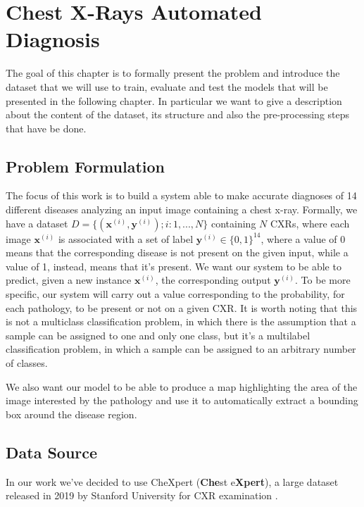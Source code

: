 \chapter{Chest X-Rays Automated Diagnosis}
\label{cha:third_chapter}

The goal of this chapter is to formally present the problem and introduce the dataset that we will use to train, evaluate and test the models that will be presented in the following chapter. In particular we want to give a description about the content of the dataset, its structure and also the pre-processing steps that have be done. 

\section{Problem Formulation}
\label{sec:problem_formulation}
The focus of this work is to build a system able to make accurate diagnoses of 14 different diseases analyzing an input image containing a chest x-ray. Formally, we have a dataset $D = \{(\mathbf{x}^{(\mathit{i})},\mathbf{y}^{(\mathit{i})}) ;\mathit{i}:1,...,N \}$ containing $N$ \acp{CXR}, where each image $\mathbf{x}^{(\mathit{i})}$ is associated with a set of label $\mathbf{y}^{(\mathit{i})} \in \{0,1\}^{14}$, where a value of 0 means that the corresponding disease is not present on the given input, while a value of 1, instead, means that it's present. We want our system to be able to predict, given a new instance $\mathbf{x}^{(\mathit{i})}$, the corresponding output  $\mathbf{y}^{(\mathit{i})}$. To be more specific, our system will carry out a value corresponding to the probability, for each pathology, to be present or not on a given \ac{CXR}. It is worth noting that this is not a multiclass classification problem, in which there is the assumption that a sample can be assigned to one and only one class, but it's a multilabel classification problem, in which a sample can be assigned to an arbitrary number of classes.

\vspace{3mm}
We also want our model to be able to produce a map highlighting the area of the image interested by the pathology and use it to automatically extract a bounding box around the disease region.

\section{Data Source}
\label{sec:data_source}
In our work we've decided to use CheXpert (\textbf{Che}st e\textbf{Xpert}), a large dataset released in 2019 by Stanford University for \ac{CXR} examination \cite{irvin2019chexpert}. 

